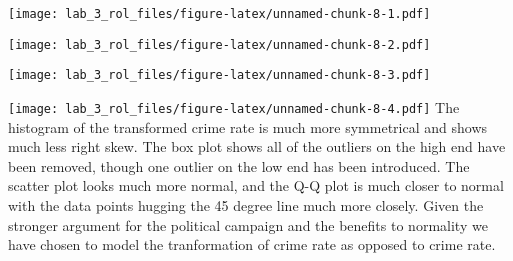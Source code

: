 \documentclass[
]{article}
\newenvironment{Shaded}{\begin{snugshade}}{\end{snugshade}}
\newcommand{\DataTypeTok}[1]{\textcolor[rgb]{0.13,0.29,0.53}{#1}}
\newcommand{\DecValTok}[1]{\textcolor[rgb]{0.00,0.00,0.81}{#1}}
\newcommand{\KeywordTok}[1]{\textcolor[rgb]{0.13,0.29,0.53}{\textbf{#1}}}
\newcommand{\NormalTok}[1]{#1}
\newcommand{\OperatorTok}[1]{\textcolor[rgb]{0.81,0.36,0.00}{\textbf{#1}}}
\newcommand{\StringTok}[1]{\textcolor[rgb]{0.31,0.60,0.02}{#1}}
\begin{document}
\begin{Shaded}
\end{Shaded}

\texttt{[image: lab\_3\_rol\_files/figure-latex/unnamed-chunk-8-1.pdf]}

\begin{Shaded}
\end{Shaded}

\texttt{[image: lab\_3\_rol\_files/figure-latex/unnamed-chunk-8-2.pdf]}

\begin{Shaded}
\end{Shaded}

\texttt{[image: lab\_3\_rol\_files/figure-latex/unnamed-chunk-8-3.pdf]}

\begin{Shaded}
\end{Shaded}

\texttt{[image: lab\_3\_rol\_files/figure-latex/unnamed-chunk-8-4.pdf]} The
histogram of the transformed crime rate is much more symmetrical and
shows much less right skew. The box plot shows all of the outliers on
the high end have been removed, though one outlier on the low end has
been introduced. The scatter plot looks much more normal, and the Q-Q
plot is much closer to normal with the data points hugging the 45 degree
line much more closely. Given the stronger argument for the political
campaign and the benefits to normality we have chosen to model the
tranformation of crime rate as opposed to crime rate.\\
\end{document}
